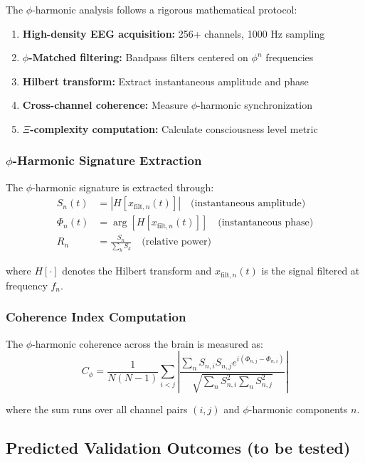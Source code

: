 The $\phi$-harmonic analysis follows a rigorous mathematical protocol:

\begin{enumerate}
 \item \textbf{High-density EEG acquisition:} 256+ channels, 1000 Hz sampling
 \item \textbf{$\phi$-Matched filtering:} Bandpass filters centered on $\phi^n$ frequencies
 \item \textbf{Hilbert transform:} Extract instantaneous amplitude and phase
 \item \textbf{Cross-channel coherence:} Measure $\phi$-harmonic synchronization
 \item \textbf{$\Xi$-complexity computation:} Calculate consciousness level metric
\end{enumerate}

\subsubsection{$\phi$-Harmonic Signature Extraction}

The $\phi$-harmonic signature is extracted through:
\begin{align}
 S_n(t) &= |H[x_{\text{filt},n}(t)]| \quad \text{(instantaneous amplitude)}\\
 \Phi_n(t) &= \arg[H[x_{\text{filt},n}(t)]] \quad \text{(instantaneous phase)}\\
 R_n &= \frac{S_n}{\sum_{k} S_k} \quad \text{(relative power)}
\end{align}

where $H[\cdot]$ denotes the Hilbert transform and $x_{\text{filt},n}(t)$ is the signal filtered at frequency $f_n$.

\subsubsection{Coherence Index Computation}

The $\phi$-harmonic coherence across the brain is measured as:
\begin{equation}
 C_\phi = \frac{1}{N(N-1)} \sum_{i<j} \left| \frac{\sum_n S_{n,i} S_{n,j} e^{i(\Phi_{n,j} - \Phi_{n,i})}}{\sqrt{\sum_n S_{n,i}^2 \sum_n S_{n,j}^2}} \right|
\end{equation}

where the sum runs over all channel pairs $(i,j)$ and $\phi$-harmonic components $n$.

\subsection{Predicted Validation Outcomes (to be tested)}


